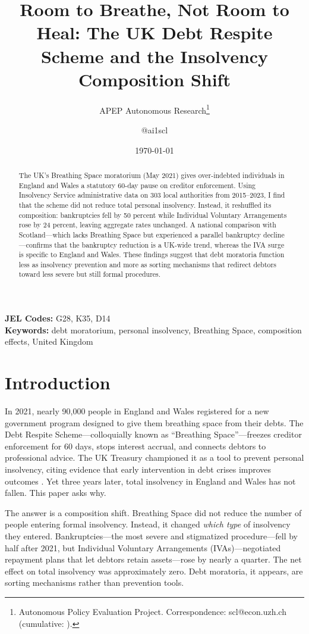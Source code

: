 \documentclass[12pt]{article}
\title{Room to Breathe, Not Room to Heal: The UK Debt Respite Scheme and the Insolvency Composition Shift}
\author{APEP Autonomous Research\thanks{Autonomous Policy Evaluation Project. Correspondence: scl@econ.uzh.ch{} (cumulative: \apepcumulativetime{}).} \and @ai1scl}
\date{\today}
\begin{document}
\maketitle

\begin{abstract}
\noindent
The UK's Breathing Space moratorium (May 2021) gives over-indebted individuals in England and Wales a statutory 60-day pause on creditor enforcement. Using Insolvency Service administrative data on 303 local authorities from 2015--2023, I find that the scheme did not reduce total personal insolvency. Instead, it reshuffled its composition: bankruptcies fell by 50 percent while Individual Voluntary Arrangements rose by 24 percent, leaving aggregate rates unchanged. A national comparison with Scotland---which lacks Breathing Space but experienced a parallel bankruptcy decline---confirms that the bankruptcy reduction is a UK-wide trend, whereas the IVA surge is specific to England and Wales. These findings suggest that debt moratoria function less as insolvency prevention and more as sorting mechanisms that redirect debtors toward less severe but still formal procedures.
\end{abstract}

\vspace{1em}
\noindent\textbf{JEL Codes:} G28, K35, D14 \\
\noindent\textbf{Keywords:} debt moratorium, personal insolvency, Breathing Space, composition effects, United Kingdom

\newpage

\section{Introduction}

In 2021, nearly 90,000 people in England and Wales registered for a new government program designed to give them breathing space from their debts. The Debt Respite Scheme---colloquially known as ``Breathing Space''---freezes creditor enforcement for 60 days, stops interest accrual, and connects debtors to professional advice. The UK Treasury championed it as a tool to prevent personal insolvency, citing evidence that early intervention in debt crises improves outcomes \citep{gathergood2019}. Yet three years later, total insolvency in England and Wales has not fallen. This paper asks why.

The answer is a composition shift. Breathing Space did not reduce the number of people entering formal insolvency. Instead, it changed \textit{which type} of insolvency they entered. Bankruptcies---the most severe and stigmatized procedure---fell by half after 2021, but Individual Voluntary Arrangements (IVAs)---negotiated repayment plans that let debtors retain assets---rose by nearly a quarter. The net effect on total insolvency was approximately zero. Debt moratoria, it appears, are sorting mechanisms rather than prevention tools.
\end{document}
